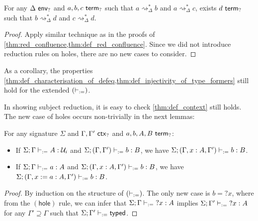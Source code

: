 \documentclass[twoside]{report}
\begin{document}

\begin{proposition}[Confluence]
\label{thm:hole_red_confluence}
For any $\Delta \ \mathsf{env}_{?}$ and $a,b,c \ \mathsf{term}_{?}$ such that $a\rightsquigarrow_\Delta^\ast b$ and $a\rightsquigarrow_\Delta^\ast c$, exists $d \ \mathsf{term}_{?}$ such that $b\rightsquigarrow_\Delta^\ast d$ and $c\rightsquigarrow_\Delta^\ast d$.
\end{proposition}

\begin{proof}
Apply similar technique as in the proofs of \cref{thm:red_confluence,thm:def_red_confluence}. Since we did not introduce reduction rules on holes, there are no new cases to consider.
\end{proof}

As a corollary, the properties \cref{thm:def_characterisation_of_defeq,thm:def_injectivity_of_type_formers} still hold for the extended $(\vdash_{:=})$.

In showing subject reduction, it is easy to check \cref{thm:def_context} still holds. The new case of holes occurs non-trivially in the next lemmas:

\begin{proposition}[Weakening]
\label{thm:hole_weakening}
For any signature $\Sigma$ and $\Gamma, \Gamma' \ \mathsf{ctx}_{?}$ and $a, b, A, B \ \mathsf{term}_{?}$:
\begin{itemize}[noitemsep]
    \item If $\Sigma; \Gamma \vdash_{:=} A : \mathcal U_i$ and $\Sigma; (\Gamma, \Gamma') \vdash_{:=} b : B$, we have $\Sigma; (\Gamma, x : A, \Gamma') \vdash_{:=} b : B$.
    \item If $\Sigma; \Gamma \vdash_{:=} a : A$ and $\Sigma; (\Gamma, x : A, \Gamma') \vdash_{:=} b : B$, we have $\Sigma; (\Gamma, x := a : A, \Gamma') \vdash_{:=} b : B$.
\end{itemize}
\end{proposition}

\begin{proof}
By induction on the structure of $(\vdash_{:=})$. The only new case is $b = {?x}$, where from the $(\mathsf{hole})$ rule, we can infer that $\Sigma; \Gamma \vdash_{:=} {?x} : A$ implies $\Sigma; \Gamma' \vdash_{:=} {?x} : A$ for any $\Gamma' \supseteq \Gamma$ such that $\Sigma; \Gamma' \vdash_{:=} \mathsf{typed}$.
\end{proof}
\end{document}
